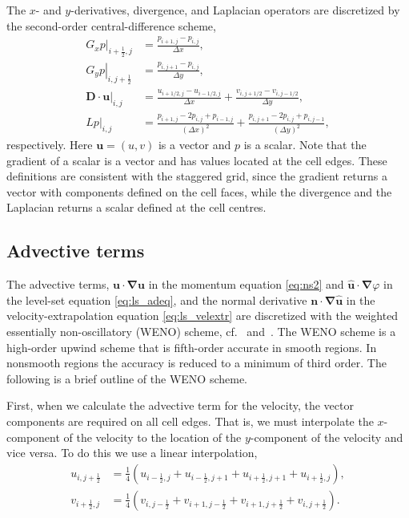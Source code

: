 \documentclass[11pt,b5paper,DIV=calc,BCOR1.3cm,headings=small,%
               footinclude=false,headsepline]{scrbook}
\newcommand*{\vct}[1]{\ensuremath{\boldsymbol{#1}}}
\newcommand*{\del}{\boldsymbol\nabla}
\newcommand*{\grad}{\del}
\begin{document}
The $x$- and $y$-derivatives, divergence, and Laplacian operators are
discretized by the second-order central-difference scheme,
\begin{align}
  \left. G_x p \right|_{i+\frac 1 2,j}
    &= \frac{p_{i+1,j} - p_{i,j}}{\Delta x}, \\
  \left. G_y p \right|_{i,j+\frac 1 2}
    &= \frac{p_{i,j+1} - p_{i,j}}{\Delta y}, \\
  \left. \vct D \cdot \vct u \right|_{i,j}
    &=   \frac{u_{i+1/2,j} - u_{i-1/2,j}}{\Delta x}
       + \frac{v_{i,j+1/2} - v_{i,j-1/2}}{\Delta y}, \\
  \left. Lp \right|_{i,j}
    &=   \frac{p_{i+1,j} - 2p_{i,j} + p_{i-1,j}}{(\Delta x)^2}
       + \frac{p_{i,j+1} - 2p_{i,j} + p_{i,j-1}}{(\Delta y)^2},
\end{align}
respectively.  Here $\vct u = (u,v)$ is a vector and $p$ is a scalar.  Note
that the gradient of a scalar is a vector and has values located at the cell
edges.  These definitions are consistent with the staggered grid, since the
gradient returns a vector with components defined on the cell faces, while the
divergence and the Laplacian returns a scalar defined at the cell centres.

\subsection{Advective terms}
The advective terms, $\vct u\cdot\grad\vct u$ in the momentum equation
\eqref{eq:ns2} and $\vct{\hat u}\cdot\grad\varphi$ in the level-set equation
\eqref{eq:ls_adeq}, and the normal derivative $\vct n\cdot\grad\vct{\hat u}$ in
the velocity-extrapolation equation \eqref{eq:ls_velextr} are discretized with
the weighted essentially non-oscillatory (WENO) scheme, cf.~\cite{Fedkiw99}
and~\cite{Jiang96}.  The WENO scheme is a high-order upwind scheme that is
fifth-order accurate in smooth regions.  In nonsmooth regions the accuracy is
reduced to a minimum of third order.  The following is a brief outline of the
WENO scheme.

First, when we calculate the advective term for the velocity, the vector
components are required on all cell edges.  That is, we must interpolate the
$x$-component of the velocity to the location of the $y$-component of the
velocity and vice versa.  To do this we use a linear interpolation,
\begin{align}
  u_{i,j+\frac 1 2} &= \frac 1 4\left(
      u_{i-\frac 1 2,j  } + u_{i-\frac 1 2,j+1}
    + u_{i+\frac 1 2,j+1} + u_{i+\frac 1 2,j  } \right), \\
  v_{i+\frac 1 2,j} &= \frac 1 4\left(
      v_{i,  j-\frac 1 2} + v_{i+1,j-\frac 1 2}
    + v_{i+1,j+\frac 1 2} + v_{i  ,j+\frac 1 2} \right).
\end{align}
\end{document}
